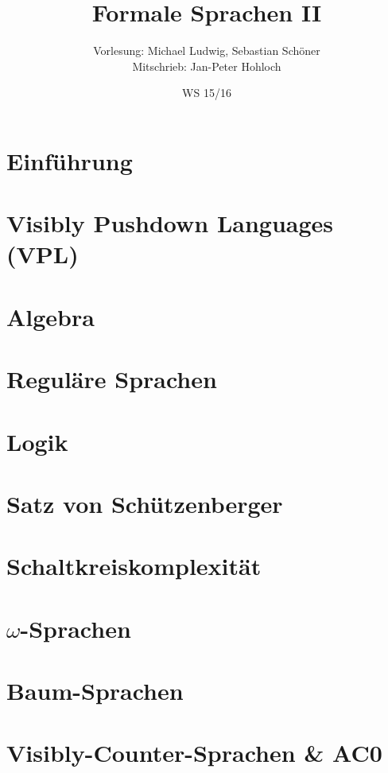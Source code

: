 \documentclass[german,a4paper,10pt]{scrreprt}
\title{Formale Sprachen II}
\author{Vorlesung: Michael Ludwig, Sebastian Schöner\\
Mitschrieb: Jan-Peter Hohloch}
\date{WS 15/16}
\begin{document}
    \maketitle
    \tableofcontents
    \newpage
    \chapter{Einführung}
        
    \chapter{Visibly Pushdown Languages (VPL)}
        
    \chapter{Algebra}
        
    \chapter{Reguläre Sprachen}
        
    \chapter{Logik}
        
    \chapter{Satz von Schützenberger}
        
    \chapter{Schaltkreiskomplexität}
        
    \chapter{$\omega$-Sprachen}
        
    \chapter{Baum-Sprachen}
        
	\chapter{Visibly-Counter-Sprachen \& AC0}
        
\end{document}

